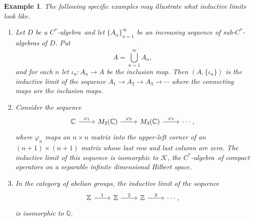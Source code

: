 \documentclass{book}
\newtheorem{example}[definition]{Example}
\def\cstar{\(C^*\)-algebra}
\begin{document}
\begin{example}
  The following specific examples may illustrate what inductive limits look like.
  \begin{enumerate}
    \item Let \(D\) be a \cstar\ and let \(\{A_n\}_{n=1}^\infty\) be an increasing sequence of 
      sub-\(C^*\)-algebras of \(D\). Put
      \[
        A=\overline{\bigcup_{n=1}^\infty A_n},
      \]
      and for each \(n\) let \(\iota_n:A_n\to A\) be the inclusion map. Then \((A,\{\iota_n\})\)
      is the inductive limit of the sequence \(A_1\to A_2\to A_3\to\cdots\) where the connecting maps are the inclusion maps.
    \item Consider the sequence
      \[
        \begin{tikzcd}
          \mathbb{C}\arrow[r,"\varphi_1"]&M_2(\mathbb{C})\arrow[r,"\varphi_2"]&M_3(\mathbb{C})\arrow[r,"\varphi_3"]&\cdots,
        \end{tikzcd}
      \]
      where \(\varphi_n\) maps an \(n\times n\) matrix into the upper-left corner of an
      \((n+1)\times(n+1)\) matrix whose last row and last column are zero. The inductive limit of this
      sequence is isomorphic to \(\mathcal{K}\), the \cstar\ of compact operators on a separable infinite dimensional Hilbert space.
    \item In the category of abelian groups, the inductive limit of the sequence
      \[
        \begin{tikzcd}
          \mathbb{Z}\arrow[r,"1"]&\mathbb{Z}\arrow[r,"2"]&\mathbb{Z}\arrow[r,"3"]&\cdots,
        \end{tikzcd}
      \]
      is isomorphic to \(\mathbb{Q}\).
  \end{enumerate}
\end{example}
\end{document}
